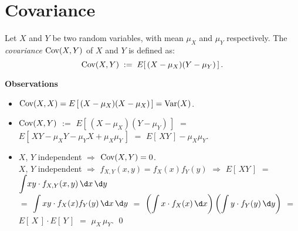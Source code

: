 \documentclass{article}
\begin{document}


\pagestyle{fancy}

%

\lfoot[]{}
\cfoot[]{}
\rfoot[]{\thepage}


\section{Covariance}
\setcounter{theorem}{0}

Let $X$ and $Y$ be two random variables, with mean $\mu_{X}$ and $\mu_{Y}$ respectively.
The \emph{covariance} $\textnormal{Cov}(X,Y)$ of $X$ and $Y$ is defined as:
\begin{equation*}
\textnormal{Cov}(X,Y) \; := \; E\!\left[\,(X-\mu_{X})(Y-\mu_{Y})\,\right].
\end{equation*}

\vskip 0.5cm
\noindent
\textbf{Observations}
\begin{itemize}
\item  $\textnormal{Cov}(X,X) = E\left[\,(X-\mu_{X})(X-\mu_{X})\,\right] = \textnormal{Var}(X)$.
\item  $\textnormal{Cov}(X,Y)$ \; $:=$ \; $E\!\left[\,(X-\mu_{X})(Y-\mu_{Y})\,\right]$
          \; $=$ \; $E\!\left[\,XY-\mu_{X}Y - \mu_{Y}X + \mu_{X}\mu_{Y}\,\right]$
          \; $=$ \; $E\!\left[\,XY\,\right] - \mu_{X}\mu_{Y}$.
\item  $X$, $Y$ independent \; $\Longrightarrow$ \; $\textnormal{Cov}(X,Y) = 0$. \\
          \proof  $X$, $Y$ independent $\Longrightarrow$ $f_{X,Y}(x,y) = f_{X}(x)f_{Y}(y)$ $\Longrightarrow$
          $E\!\left[\,XY\,\right]$ $=$ $\displaystyle{\int} xy \cdot f_{X,Y}(x,y)\,\d x \,\d y$ \\ $=$
          $\displaystyle{\int xy \cdot f_{X}(x) f_{Y}(y) \, \d x \, \d y}$ $=$
          $\left(\displaystyle{\int x \cdot f_{X}(x) \,\d x}\right)\left(\displaystyle{\int y \cdot f_{Y}(y) \, \d y}\right)$
          $=$ $E\!\left[\,X\,\right]\cdot E\!\left[\,Y\,\right]$ $=$ $\mu_{X}\,\mu_{Y}$. \qed
\end{itemize}
\end{document}
